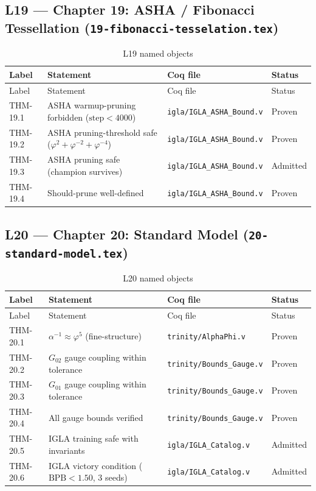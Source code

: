 \subsection{L19 — Chapter 19: ASHA / Fibonacci Tessellation
  (\texttt{19-fibonacci-tesselation.tex})}
\label{sec:A-L19}

\begin{longtable}{lp{6cm}ll}
\toprule
Label & Statement & Coq file & Status \\
\midrule
\endfirsthead
\toprule
Label & Statement & Coq file & Status \\
\midrule
\endhead
\bottomrule
\endfoot
\bottomrule
\caption{L19 named objects}
\endlastfoot
THM-19.1 & ASHA warmup-pruning forbidden ($\text{step}<4000$) &
  \texttt{igla/IGLA\_ASHA\_Bound.v} & Proven \\
THM-19.2 &
  ASHA pruning-threshold safe
  ($\varphi^{2}+\varphi^{-2}+\varphi^{-4}$) &
  \texttt{igla/IGLA\_ASHA\_Bound.v} & Proven \\
THM-19.3 & ASHA pruning safe (champion survives) &
  \texttt{igla/IGLA\_ASHA\_Bound.v} & Admitted \\
THM-19.4 & Should-prune well-defined &
  \texttt{igla/IGLA\_ASHA\_Bound.v} & Proven \\
\end{longtable}

\subsection{L20 — Chapter 20: Standard Model
  (\texttt{20-standard-model.tex})}
\label{sec:A-L20}

\begin{longtable}{lp{6cm}ll}
\toprule
Label & Statement & Coq file & Status \\
\midrule
\endfirsthead
\toprule
Label & Statement & Coq file & Status \\
\midrule
\endhead
\bottomrule
\endfoot
\bottomrule
\caption{L20 named objects}
\endlastfoot
THM-20.1 & $\alpha^{-1}\approx\varphi^{5}$ (fine-structure) &
  \texttt{trinity/AlphaPhi.v} & Proven \\
THM-20.2 & $G_{02}$ gauge coupling within tolerance &
  \texttt{trinity/Bounds\_Gauge.v} & Proven \\
THM-20.3 & $G_{01}$ gauge coupling within tolerance &
  \texttt{trinity/Bounds\_Gauge.v} & Proven \\
THM-20.4 & All gauge bounds verified &
  \texttt{trinity/Bounds\_Gauge.v} & Proven \\
THM-20.5 & IGLA training safe with invariants &
  \texttt{igla/IGLA\_Catalog.v} & Admitted \\
THM-20.6 & IGLA victory condition ($\text{BPB}<1.50$, 3 seeds) &
  \texttt{igla/IGLA\_Catalog.v} & Admitted \\
\end{longtable}

